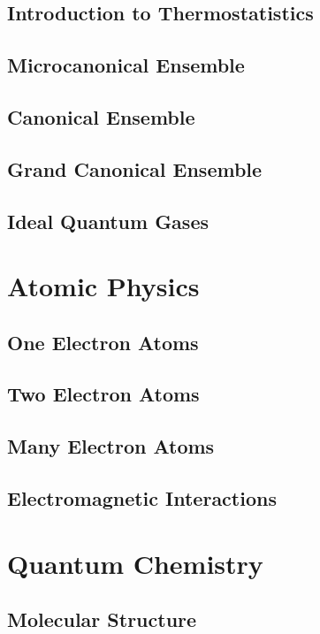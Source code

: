 \documentclass[a4paper, 11pt]{book}
\newcommand{\1}{\opr{\mathds{1}}}
\begin{document}
	\chapter{Introduction to Thermostatistics}
		
	\chapter{Microcanonical Ensemble}
		
	\chapter{Canonical Ensemble}
		
	\chapter{Grand Canonical Ensemble}
		
	\chapter{Ideal Quantum Gases}
		
\part{Atomic Physics}
	\chapter{One Electron Atoms}
		
	\chapter{Two Electron Atoms}
		
	\chapter{Many Electron Atoms}
		
	\chapter{Electromagnetic Interactions}
		
\part{Quantum Chemistry}
	\chapter{Molecular Structure}
		
\end{document}
